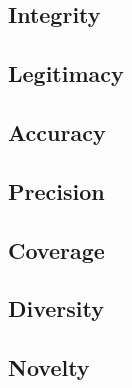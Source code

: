 \subsection{Integrity}
\subsection{Legitimacy}

\subsection{Accuracy}
\subsection{Precision}
\subsection{Coverage}
\subsection{Diversity}
\subsection{Novelty}



